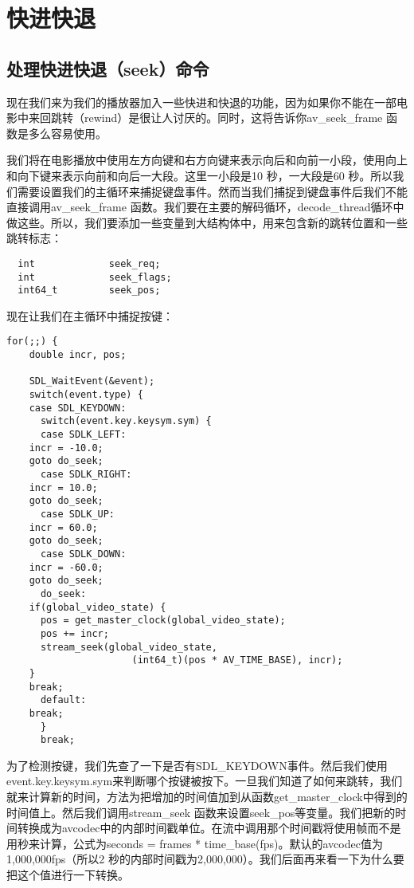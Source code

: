 ﻿\chapter{快进快退}
\label{ch7}
\section{处理快进快退（seek）命令}
现在我们来为我们的播放器加入一些快进和快退的功能，因为如果你不能在一部电影中来回跳转（rewind）是很让人讨厌的。同时，这将告诉你av_seek_frame 函数是多么容易使用。

我们将在电影播放中使用左方向键和右方向键来表示向后和向前一小段，使用向上和向下键来表示向前和向后一大段。这里一小段是10 秒，一大段是60 秒。所以我们需要设置我们的主循环来捕捉键盘事件。然而当我们捕捉到键盘事件后我们不能直接调用av_seek_frame 函数。我们要在主要的解码循环，decode_thread循环中做这些。所以，我们要添加一些变量到大结构体中，用来包含新的跳转位置和一些跳转标志：
\begin{lstlisting}
  int             seek_req;
  int             seek_flags;
  int64_t         seek_pos;
\end{lstlisting}

现在让我们在主循环中捕捉按键：

\begin{lstlisting}
for(;;) {
    double incr, pos;

    SDL_WaitEvent(&event);
    switch(event.type) {
    case SDL_KEYDOWN:
      switch(event.key.keysym.sym) {
      case SDLK_LEFT:
    incr = -10.0;
    goto do_seek;
      case SDLK_RIGHT:
    incr = 10.0;
    goto do_seek;
      case SDLK_UP:
    incr = 60.0;
    goto do_seek;
      case SDLK_DOWN:
    incr = -60.0;
    goto do_seek;
      do_seek:
    if(global_video_state) {
      pos = get_master_clock(global_video_state);
      pos += incr;
      stream_seek(global_video_state,
                      (int64_t)(pos * AV_TIME_BASE), incr);
    }
    break;
      default:
    break;
      }
      break;
\end{lstlisting}

为了检测按键，我们先查了一下是否有SDL_KEYDOWN事件。然后我们使用event.key.keysym.sym来判断哪个按键被按下。一旦我们知道了如何来跳转，我们就来计算新的时间，方法为把增加的时间值加到从函数get_master_clock中得到的时间值上。然后我们调用stream_seek 函数来设置seek_pos等变量。我们把新的时间转换成为avcodec中的内部时间戳单位。在流中调用那个时间戳将使用帧而不是用秒来计算，公式为seconds = frames * time_base(fps)。默认的avcodec值为1,000,000fps（所以2 秒的内部时间戳为2,000,000）。我们后面再来看一下为什么要把这个值进行一下转换。

